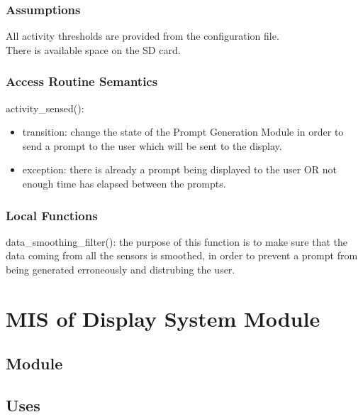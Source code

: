 \documentclass[12pt, titlepage]{article}
\begin{document}
\subsubsection{Assumptions}

All activity thresholds are provided from the configuration file. \\
There is available space on the SD card. \\

\subsubsection{Access Routine Semantics}

\noindent activity\_sensed():
\begin{itemize}
\item transition: change the state of the Prompt Generation Module in order to send a prompt to the user which will be sent to the display.  
\item exception: there is already a prompt being displayed to the user OR not enough time has elapsed between the prompts.
\end{itemize}

\subsubsection{Local Functions}

data\_smoothing\_filter(): the purpose of this function is to make sure that the data coming from all the sensors is smoothed, in order to prevent a prompt from being generated erroneously and distrubing the user.

\newpage



\section{MIS of Display System Module} \label{mDS_2} 

\subsection{Module}


\subsection{Uses}
\end{document}
